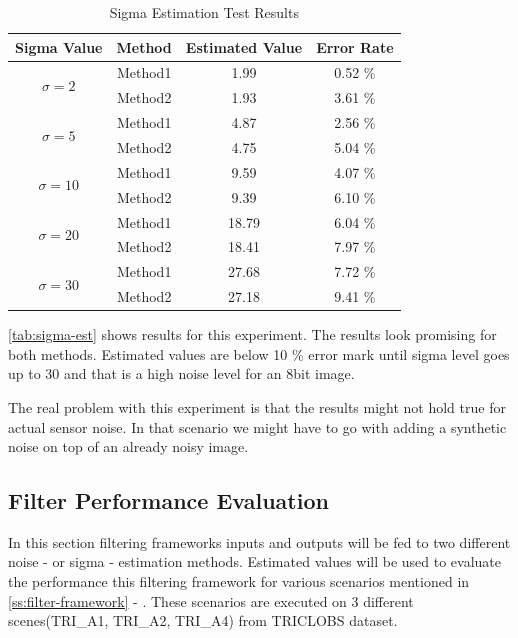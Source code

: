 \documentclass[10pt,twocolumn,letterpaper]{article}
\begin{document}
\begin{table}[h!]
	\centering
	\begin{tabular}{cccc}
		\toprule
		\bfseries Sigma Value & \bfseries Method & \bfseries Estimated Value & \bfseries Error Rate\\
		\midrule
		\multirow{2}{*}{\(\sigma=2\)} & Method1 & 1.99 & 0.52 \% \\
		& Method2 & 1.93 & 3.61 \% \\
		\multirow{2}{*}{\(\sigma=5\)} & Method1 & 4.87 & 2.56 \% \\
		& Method2 & 4.75 & 5.04 \% \\
		\multirow{2}{*}{\(\sigma=10\)} & Method1 & 9.59 & 4.07 \% \\
		& Method2 & 9.39 & 6.10 \% \\
		\multirow{2}{*}{\(\sigma=20\)} & Method1 & 18.79 & 6.04 \% \\
		& Method2 & 18.41 & 7.97 \% \\
		\multirow{2}{*}{\(\sigma=30\)} & Method1 & 27.68 & 7.72 \% \\
		& Method2 & 27.18 & 9.41 \% \\
		\bottomrule
	\end{tabular}
	\caption{Sigma Estimation Test Results}
	\label{tab:sigma-est}
\end{table}

\autoref{tab:sigma-est} shows results for this experiment. The results look promising for both methods. Estimated values are below 10 \% error mark until sigma level goes up to 30 and that is a high noise level for an 8bit image.

The real problem with this experiment is that the results might not hold true for actual sensor noise. In that scenario we might have to go with adding a synthetic noise on top of an already noisy image.

\subsection{Filter Performance Evaluation}
In this section filtering frameworks inputs and outputs will be fed to two different noise - or sigma - estimation methods. Estimated values will be used to evaluate the performance this filtering framework for various scenarios mentioned in  \ref{ss:filter-framework} -  . These scenarios are executed on 3 different scenes(TRI\_A1, TRI\_A2, TRI\_A4) from TRICLOBS\cite{triclobs} dataset.
\end{document}
